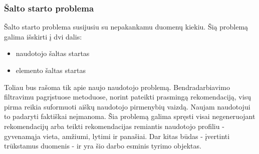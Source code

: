 \documentclass{VUMIFInfMagistrinis}
\begin{document}
\subsubsection{Šalto starto problema}
Šalto starto problema susijusiu su nepakankamu duomenų kiekiu. Šią problemą galima išskirti į dvi dalis:
\begin{itemize}
	\item naudotojo šaltas startas
	\item elemento šaltas startas
\end{itemize}
\indent 
Toliau bus rašoma tik apie naujo naudotojo problemą. Bendradarbiavimo filtravimu pagrįstuose metoduose, norint pateikti prasmingą rekomendaciją, visų pirma reikia suformuoti aiškų naudotojo pirmenybių vaizdą. Naujam naudotojui to padaryti faktiškai neįmanoma. Šia problemą galima spręsti visai negeneruojant rekomendacijų arba teikti rekomendacijas remiantis naudotojo profiliu - gyvenamąja vieta, amžiumi, lytimi ir panašiai. Dar kitas būdas - įvertinti trūkstamus duomenis - ir yra šio darbo esminis tyrimo objektas.
\end{document}
